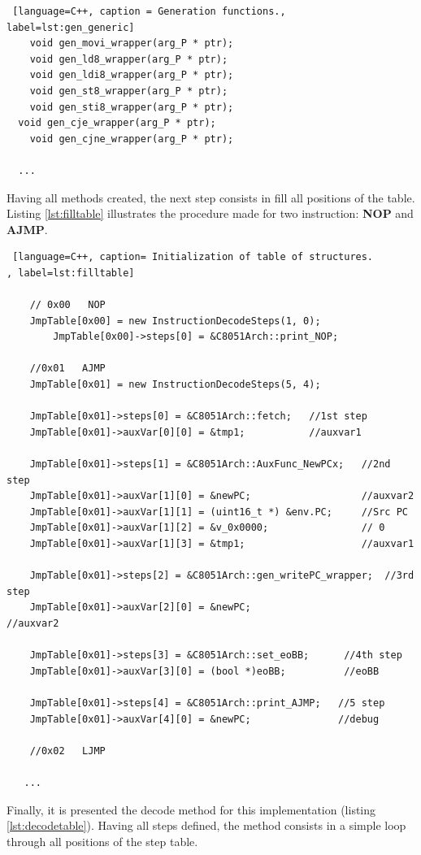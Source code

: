 \begin{lstlisting} [language=C++, caption = Generation functions., label=lst:gen_generic]
	void gen_movi_wrapper(arg_P * ptr);
	void gen_ld8_wrapper(arg_P * ptr);
	void gen_ldi8_wrapper(arg_P * ptr);
	void gen_st8_wrapper(arg_P * ptr);
	void gen_sti8_wrapper(arg_P * ptr);
  void gen_cje_wrapper(arg_P * ptr);
	void gen_cjne_wrapper(arg_P * ptr);
  
  ...
\end{lstlisting}

Having all methods created, the next step consists in fill all positions of the table. Listing \ref{lst:filltable} illustrates the procedure made for two instruction: \textbf{NOP} and \textbf{AJMP}.

\begin{lstlisting} [language=C++, caption= Initialization of table of structures.
, label=lst:filltable]
	
	// 0x00   NOP
	JmpTable[0x00] = new InstructionDecodeSteps(1, 0);
        JmpTable[0x00]->steps[0] = &C8051Arch::print_NOP;

	//0x01   AJMP
	JmpTable[0x01] = new InstructionDecodeSteps(5, 4);

	JmpTable[0x01]->steps[0] = &C8051Arch::fetch;   //1st step
	JmpTable[0x01]->auxVar[0][0] = &tmp1;           //auxvar1

	JmpTable[0x01]->steps[1] = &C8051Arch::AuxFunc_NewPCx;   //2nd step
	JmpTable[0x01]->auxVar[1][0] = &newPC;                   //auxvar2
	JmpTable[0x01]->auxVar[1][1] = (uint16_t *) &env.PC;     //Src PC
	JmpTable[0x01]->auxVar[1][2] = &v_0x0000;                // 0 
	JmpTable[0x01]->auxVar[1][3] = &tmp1;                    //auxvar1

	JmpTable[0x01]->steps[2] = &C8051Arch::gen_writePC_wrapper;  //3rd step
	JmpTable[0x01]->auxVar[2][0] = &newPC;                    //auxvar2

	JmpTable[0x01]->steps[3] = &C8051Arch::set_eoBB;      //4th step
	JmpTable[0x01]->auxVar[3][0] = (bool *)eoBB;          //eoBB
        
	JmpTable[0x01]->steps[4] = &C8051Arch::print_AJMP;   //5 step
	JmpTable[0x01]->auxVar[4][0] = &newPC;               //debug

	//0x02   LJMP
	
   ...
\end{lstlisting}

Finally, it is presented the decode method for this implementation (listing \ref{lst:decodetable}). Having all steps defined, the method consists in a simple loop through all positions of the step table. 


